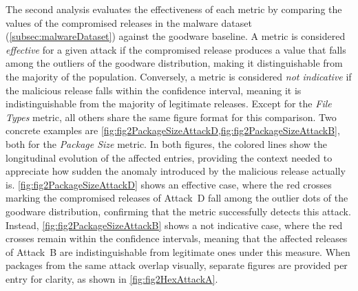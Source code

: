 The second analysis evaluates the effectiveness of each metric by comparing the values of the
compromised releases in the malware dataset (\cref{subsec:malwareDataset}) against the goodware baseline.
A metric is considered \emph{effective} for a given attack if the compromised release produces
a value that falls among the outliers of the goodware distribution,
making it distinguishable from the majority of the population.
Conversely, a metric is considered \emph{not indicative} if the malicious release falls within the confidence interval,
meaning it is indistinguishable from the majority of legitimate releases.
Except for the \emph{File Types} metric, all others share the same figure format for this comparison.
Two concrete examples are \cref{fig:fig2PackageSizeAttackD,fig:fig2PackageSizeAttackB}, both for the \emph{Package Size} metric.
In both figures, the colored lines show the longitudinal evolution of the affected entries, 
providing the context needed to appreciate how sudden the anomaly introduced by the malicious release actually is.
\cref{fig:fig2PackageSizeAttackD} shows an effective case, where the red crosses marking the compromised releases of Attack~D 
fall among the outlier dots of the goodware distribution, confirming that the metric successfully detects this attack.
Instead, \cref{fig:fig2PackageSizeAttackB} shows a not indicative case, where the red crosses remain within the confidence intervals,
meaning that the affected releases of Attack~B are indistinguishable from legitimate ones under this measure.
When packages from the same attack overlap visually, separate figures are provided per entry for clarity, as shown in \cref{fig:fig2HexAttackA}.